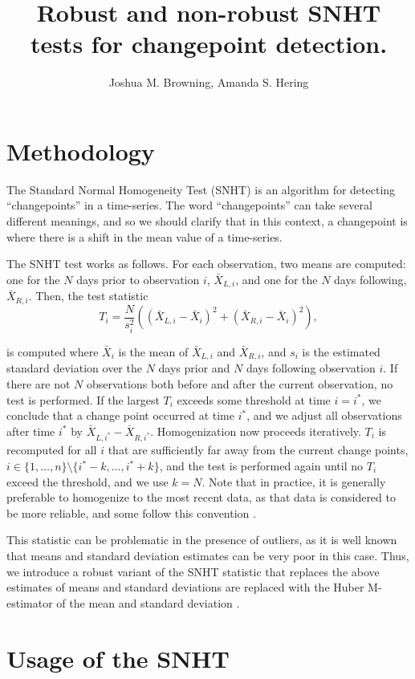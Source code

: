 \documentclass[nojss]{jss}\usepackage[]{graphicx}\usepackage[]{color}
\title{\bf Robust and non-robust SNHT tests for changepoint detection.}
\author{Joshua M. Browning, Amanda S. Hering}
\begin{document}
\section{Methodology}

The Standard Normal Homogeneity Test (SNHT) is an algorithm for detecting ``changepoints'' in a time-series.  The word ``changepoints'' can take several different meanings, and so we should clarify that in this context, a changepoint is where there is a shift in the mean value of a time-series.

The SNHT test works as follows.  For each observation, two means are computed: one for the $N$ days prior to observation $i$, $\bar{X}_{L,i}$, and one for the $N$ days following, $\bar{X}_{R,i}$.  Then, the test statistic
\begin{equation}
    T_i = \frac{N}{s_i^2}\left( (\bar{X}_{L,i}-\bar{X}_i)^2 + (\bar{X}_{R,i}-\bar{X}_i)^2\right),
\end{equation}

is computed where $\bar{X}_i$ is the mean of $\bar{X}_{L,i}$ and $\bar{X}_{R,i}$, and $s_i$ is the estimated standard deviation over the $N$ days prior and $N$ days following observation $i$.  If there are not $N$ observations both before and after the current observation, no test is performed.  If the largest $T_i$ exceeds some threshold at time $i=i^*$, we conclude that a change point occurred at time $i^*$, and we adjust all observations after time $i^*$ by $\bar{X}_{L,i^*}-\bar{X}_{R,i^*}$.  Homogenization now proceeds iteratively.  $T_i$ is recomputed for all $i$ that are sufficiently far away from the current change points, $i\in\{1,\ldots,n\} \setminus \{i^*-k, \ldots, i^*+k\}$, and the test is performed again until no $T_i$ exceed the threshold, and we use $k=N$.  Note that in practice, it is generally preferable to homogenize to the most recent data, as that data is considered to be more reliable, and some follow this convention \cite{domonkos13}.

This statistic can be problematic in the presence of outliers, as it is well known that means and standard deviation estimates can be very poor in this case.  Thus, we introduce a robust variant of the SNHT statistic that replaces the above estimates of means and standard deviations are replaced with the Huber M-estimator of the mean and standard deviation \cite{huber11}.

\section{Usage of the SNHT}
\end{document}
